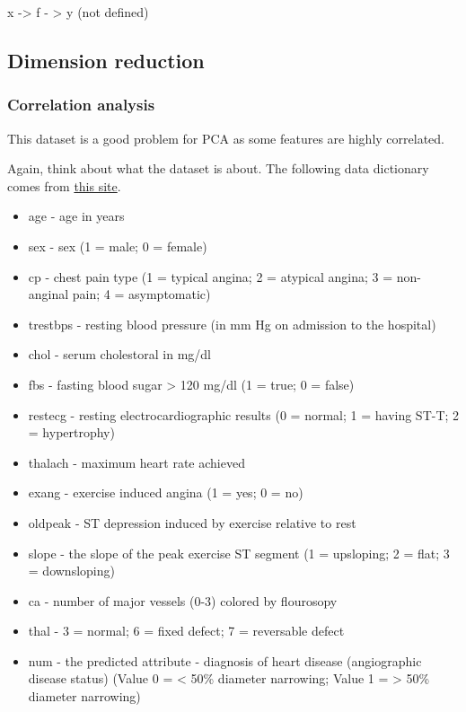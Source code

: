 \documentclass[
]{book}
\providecommand{\tightlist}{%
  \setlength{\itemsep}{0pt}\setlength{\parskip}{0pt}}
\begin{document}
x -\textgreater{} f - \textgreater{} y (not defined)

\subsection{Dimension reduction}\label{dimension-reduction}

\subsubsection{Correlation analysis}\label{correlation-analysis}

This dataset is a good problem for PCA as some features are highly correlated.

Again, think about what the dataset is about. The following data dictionary comes from \href{http://rstudio-pubs-static.s3.amazonaws.com/24341_184a58191486470cab97acdbbfe78ed5.html}{this site}.

\begin{itemize}
\tightlist
\item
  age - age in years
\item
  sex - sex (1 = male; 0 = female)
\item
  cp - chest pain type (1 = typical angina; 2 = atypical angina; 3 = non-anginal pain; 4 = asymptomatic)
\item
  trestbps - resting blood pressure (in mm Hg on admission to the hospital)
\item
  chol - serum cholestoral in mg/dl
\item
  fbs - fasting blood sugar \textgreater{} 120 mg/dl (1 = true; 0 = false)
\item
  restecg - resting electrocardiographic results (0 = normal; 1 = having ST-T; 2 = hypertrophy)
\item
  thalach - maximum heart rate achieved
\item
  exang - exercise induced angina (1 = yes; 0 = no)
\item
  oldpeak - ST depression induced by exercise relative to rest
\item
  slope - the slope of the peak exercise ST segment (1 = upsloping; 2 = flat; 3 = downsloping)
\item
  ca - number of major vessels (0-3) colored by flourosopy
\item
  thal - 3 = normal; 6 = fixed defect; 7 = reversable defect
\item
  num - the predicted attribute - diagnosis of heart disease (angiographic disease status) (Value 0 = \textless{} 50\% diameter narrowing; Value 1 = \textgreater{} 50\% diameter narrowing)
\end{itemize}
\end{document}
